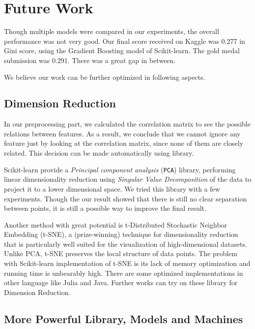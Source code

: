 \documentclass{standalone}
\begin{document}
\section{Future Work}

Though multiple models were compared in our experiments, the overall
performance was not very good. Our final score received on Kaggle was 0.277 in
Gini score, using the Gradient Boosting model of Scikit-learn. The gold medal
submission was 0.291. There was a great gap in between.

We believe our work can be further optimized in following aspects.

\subsection{Dimension Reduction}

In our preprocessing part, we calculated the correlation matrix to see the
possible relations between features. As a result, we conclude that we cannot
ignore any feature just by looking at the correlation matrix, since none of
them are closely related. This decision can be made automatically using
library.

Scikit-learn provide a \emph{Principal component analysis} (\verb|PCA|)
library, performing linear dimensionality reduction using \emph{Singular Value
Decomposition} of the data to project it to a lower dimensional space. We tried
this library with a few experiments. Though the our result showed that there is
still no clear separation between points, it is still a possible way to improve
the final result.

Another method with great potential is t-Distributed Stochastic Neighbor
Embedding (t-SNE)\cite{van2014accelerating}, a (prize-winning) technique for
dimensionality reduction that is particularly well suited for the visualization
of high-dimensional datasets\cite{tsne}. Unlike PCA, t-SNE preserves the local
structure of data points. The problem with Scikit-learn implementation of t-SNE
is its lack of memory optimization and running time is unbearably high. There
are some optimized implementations in other language like
Julia\cite{tsne:julia} and Java\cite{tsne:java}. Further works can try on these
library for Dimension Reduction.

\subsection{More Powerful Library, Models and Machines}
\end{document}
